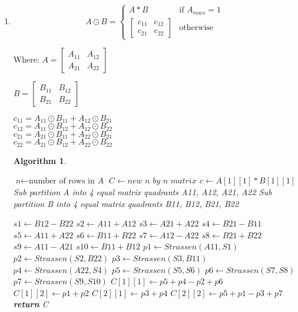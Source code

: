 \documentclass[12pt]{article}%
\newtheorem{algorithm}[theorem]{Algorithm}
\begin{document}
\begin{enumerate}[label=(\alph*)]
\item 

$$
 A \odot B = 
  \begin{cases}
   A*B & \text{if } A_{rows} = 1 \\
   \begin{bmatrix}
c_{11} & c_{12}\\
c_{21} & c_{22}
\end{bmatrix}       & \text{otherwise}
  \end{cases}
$$

Where:
$A =
\begin{bmatrix}
A_{11} & A_{12}\\
A_{21} & A_{22}
\end{bmatrix}$

$B =
\begin{bmatrix}
B_{11} & B_{12}\\
B_{21} & B_{22}
\end{bmatrix}$

$c_{11} = A_{11} \odot B_{11} + A_{12} \odot B_{21}$\\
$c_{12} = A_{11} \odot B_{12} + A_{12} \odot B_{22}$\\
$c_{21} = A_{21} \odot B_{11} + A_{22} \odot B_{21}$\\
$c_{22} = A_{21} \odot B_{12} + A_{22} \odot B_{22}$

\newpage

\begin{algorithm}
\caption{Strassen's Algorithm}\label{euclid}
\begin{algorithmic}[1]
\State $\textit{n} \gets \text{number of rows in}\textit{ A}$
\State $C \gets \textit{new n by n matrix}$
\State $c \gets A[1][1] * B[1][1]$ 
\Else{}
\State Sub partition A into 4 equal matrix quadrants A11, A12, A21, A22
\State Sub partition B into 4 equal matrix quadrants B11, B12, B21, B22

\State $s1 \gets B12 - B22$ 
\State $s2 \gets A11 + A12$ 
\State $s3 \gets A21 + A22$
\State $s4 \gets B21 - B11$
\State $s5 \gets A11 + A22$
\State $s6 \gets B11 + B22$
\State $s7 \gets A12 - A22$
\State $s8 \gets B21 + B22$ 
\State $s9 \gets A11 - A21$
\State $s10 \gets B11 + B12$
\State $p1 \gets Strassen(A11,S1)$ 
\State $p2 \gets Strassen(S2,B22)$ 
\State $p3 \gets Strassen(S3,B11)$
\State $p4 \gets Strassen(A22,S4)$
\State $p5 \gets Strassen(S5,S6)$
\State $p6 \gets Strassen(S7,S8)$
\State $p7 \gets Strassen(S9,S10)$
\State $C[1][1] \gets p5 + p4 - p2 + p6$
\State $C[1][2] \gets p1 + p2$
\State $C[2][1] \gets p3 + p4$
\State $C[2][2] \gets p5 + p1 - p3 + p7$
\EndIf
\State \textbf{return} C
\EndProcedure
\end{algorithmic}
\end{algorithm}


\end{enumerate}
\end{document}
